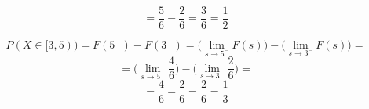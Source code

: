 \documentclass{article}
\begin{document}
\begin{equation*}
    = \frac{5}{6} - \frac{2}{6} = \frac{3}{6} = \frac{1}{2}
\end{equation*}

\begin{equation*}
    P(X \in [3, 5)) = F(5^{-}) - F(3^{-}) = \Big(\lim_{s \to 5^{-}} F(s)\Big) - \Big(\lim_{s \to 3^{-}} F(s)\Big) =
\end{equation*}
\begin{equation*}
    = \Big(\lim_{s \to 5^{-}} \frac{4}{6}\Big) - \Big(\lim_{s \to 3^{-}} \frac{2}{6}\Big) = 
\end{equation*}
\begin{equation*}
    = \frac{4}{6} - \frac{2}{6} = \frac{2}{6} = \frac{1}{3}
\end{equation*}
\end{document}
